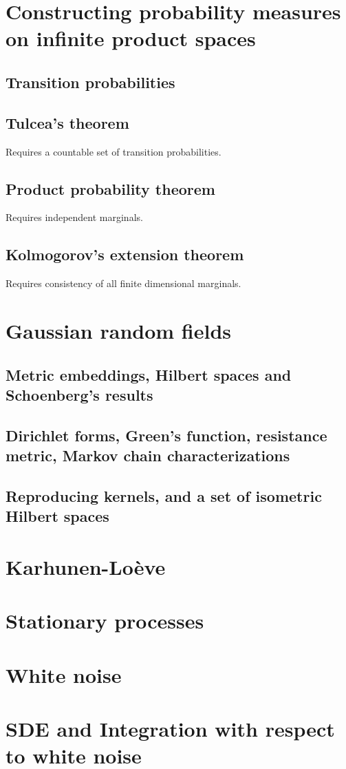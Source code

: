 

\section{Constructing probability measures on infinite product spaces}
\subsection{Transition probabilities}
\subsection{Tulcea's theorem}
Requires a countable set of transition probabilities.
\subsection{Product probability theorem}
Requires independent marginals.
\subsection{Kolmogorov's extension theorem}
Requires consistency of all finite dimensional marginals.


\section{Gaussian random fields}

\subsection{Metric embeddings, Hilbert spaces and Schoenberg's results}
\subsection{Dirichlet forms, Green's function, resistance metric, Markov chain characterizations}
\subsection{Reproducing kernels, and a set of isometric Hilbert spaces}

\section{Karhunen-Lo\`eve}

\section{Stationary processes}

\section{White noise}

\section{SDE and Integration with respect to white noise}
